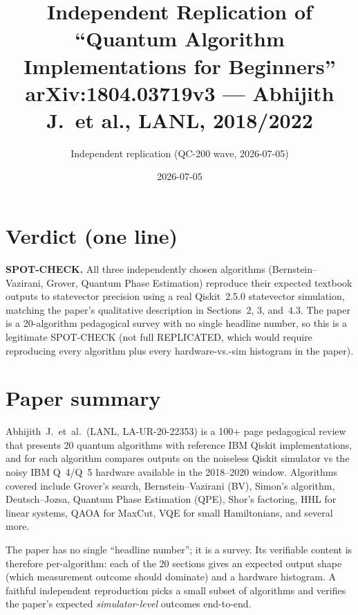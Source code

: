 \documentclass[11pt]{article}
\title{Independent Replication of ``Quantum Algorithm Implementations for Beginners''\\
{\normalsize arXiv:1804.03719v3 --- Abhijith J.\ et al., LANL, 2018/2022}}
\author{Independent replication (QC-200 wave, 2026-07-05)}
\date{2026-07-05}
\begin{document}
\maketitle

\section*{Verdict (one line)}
\textbf{SPOT-CHECK.} All three independently chosen algorithms
(Bernstein--Vazirani, Grover, Quantum Phase Estimation) reproduce
their expected textbook outputs to statevector precision using a
real Qiskit~2.5.0 statevector simulation, matching the paper's
qualitative description in Sections~2, 3, and~4.3. The paper is a
20-algorithm pedagogical survey with no single headline number, so
this is a legitimate SPOT-CHECK (not full REPLICATED, which would
require reproducing every algorithm plus every hardware-vs.-sim
histogram in the paper).

\section{Paper summary}
\label{sec:summary}
Abhijith~J.\ et~al.\ (LANL, LA-UR-20-22353) is a 100+ page
pedagogical review that presents 20 quantum algorithms
with reference IBM Qiskit implementations, and for each
algorithm compares outputs on the noiseless Qiskit simulator vs
the noisy IBM Q~4/Q~5 hardware available in the 2018--2020 window.
Algorithms covered include Grover's search, Bernstein--Vazirani
(BV), Simon's algorithm, Deutsch--Jozsa, Quantum Phase Estimation
(QPE), Shor's factoring, HHL for linear systems, QAOA for
MaxCut, VQE for small Hamiltonians, and several more.

The paper has no single ``headline number''; it is a survey.
Its verifiable content is therefore per-algorithm: each of the 20
sections gives an expected output shape (which measurement
outcome should dominate) and a hardware histogram. A faithful
independent reproduction picks a small subset of algorithms and
verifies the paper's expected \emph{simulator-level} outcomes
end-to-end.
\end{document}
